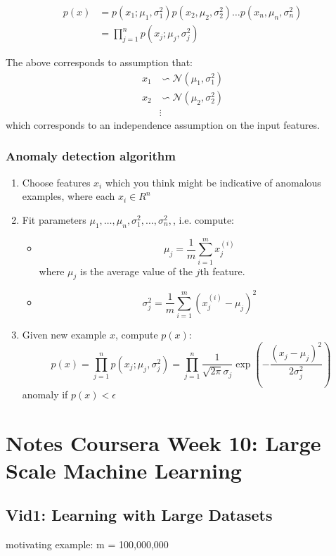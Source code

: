 \documentclass[fontsize=11]{article}
\begin{document}
\begin{align*}
p(x) &= p(x_1; \mu_1,\sigma_1^2)p(x_2, \mu_2,\sigma_2^2)\dots p(x_n, \mu_n,\sigma_n^2)\\
&= \prod_{j=1}^n p(x_j ; \mu_j, \sigma_j^2)
\end{align*}

The above corresponds to assumption that: 
\begin{align*}
x_1  &\backsim \mathcal{N}(\mu_1, \sigma_1^2) \\
x_2  &\backsim \mathcal{N}(\mu_2, \sigma_2^2) \\
      &\vdots
\end{align*}
which corresponds to an independence assumption on the input features.

\subsubsection{Anomaly detection algorithm}
\begin{enumerate}
\item Choose features $x_i$ which you think might be indicative of anomalous examples, where each $x_i \in R^n$
\item Fit parameters $\mu_1, \dots, \mu_n, \sigma^2_1, \dots, \sigma^2_n,$, i.e. compute:
\begin{itemize}
\item[] $$ \mu_j = \frac{1}{m}\sum_{i=1}^m x_j^{(i)}$$
where $\mu_j$ is the average value of the $j$th feature.
\item[] $$ \sigma_j^2 = \frac{1}{m}\sum_{i=1}^m (x_j^{(i)} - \mu_j)^2 $$
\end{itemize}
\item Given new example $x$, compute $p(x)$:
$$ p(x) =  \prod_{j=1}^n p(x_j ; \mu_j, \sigma_j^2) = \prod_{j=1}^n \frac{1}{\sqrt{2\pi}\sigma_j} \exp \left(-\frac{(x_j - \mu_j)^2}{2\sigma^2_j} \right)$$ 
anomaly if $p(x) < \epsilon$
\end{enumerate}

\section{Notes Coursera Week 10: Large Scale Machine Learning }

\subsection{Vid1: Learning with Large Datasets}
motivating example:
m = 100,000,000
\end{document}
